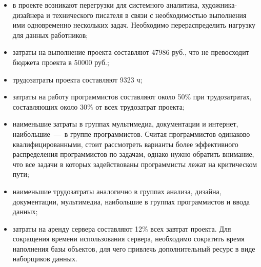 \begin{itemize}
	\item в проекте возникают перегрузки для системного аналитика, художника-дизайнера и технического писателя в связи с необходимостью выполнения ими одновременно нескольких задач. Необходимо перераспределить нагрузку для данных работников;
	\item затраты на выполнение проекта составляют 47986 руб., что не превосходит бюджета проекта в 50000 руб.;
	\item трудозатраты проекта составляют 9323 ч;
	\item затраты на работу программистов составляют около 50\% при трудозатратах, составляющих около 30\% от всех трудозатрат проекта;
	\item наименьшие затраты в группах мультимедиа, документации и интернет, наибольшие~---~в группе программистов. Считая программистов одинаково квалифицированными, стоит рассмотреть варианты более эффективного распределения программистов по задачам, однако нужно обратить внимание, что все задачи в которых задействованы программисты лежат на критическом пути;
	\item наименьшие трудозатраты аналогично в группах анализа, дизайна, документации, мультимедиа, наибольшие в группах программистов и ввода данных;
	\item затраты на аренду сервера составляют 12\% всех завтрат проекта. Для сокращения времени использования сервера, необходимо сократить время наполнения базы объектов, для чего привлечь дополнительный ресурс в виде наборщиков данных.
\end{itemize}
